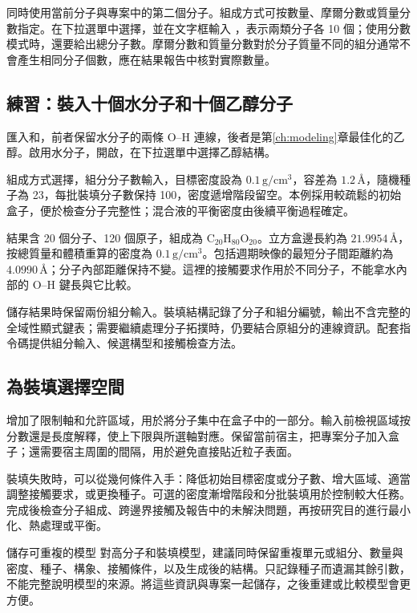 同時使用當前分子與專案中的第二個分子。組成方式可按數量、摩爾分數或質量分數指定。在下拉選單中選擇，並在文字框輸入 ，表示兩類分子各 10 個；使用分數模式時，還要給出總分子數。摩爾分數和質量分數對於分子質量不同的組分通常不會產生相同分子個數，應在結果報告中核對實際數量。

\subsection{練習：裝入十個水分子和十個乙醇分子}

匯入和，前者保留水分子的兩條 O--H 連線，後者是第\ref{ch:modeling}章最佳化的乙醇。啟用水分子，開啟，在下拉選單中選擇乙醇結構。

組成方式選擇，組分分子數輸入，目標密度設為 $0.1\,\mathrm{g/cm^3}$，容差為 $1.2\,\text{\AA}$，隨機種子為 23，每批裝填分子數保持 100，密度遞增階段留空。本例採用較疏鬆的初始盒子，便於檢查分子完整性；混合液的平衡密度由後續平衡過程確定。

結果含 20 個分子、120 個原子，組成為 $\mathrm{C_{20}H_{80}O_{20}}$。立方盒邊長約為 $21.9954\,\text{\AA}$，按總質量和體積重算的密度為 $0.1\,\mathrm{g/cm^3}$。包括週期映像的最短分子間距離約為 $4.0990\,\text{\AA}$；分子內部距離保持不變。這裡的接觸要求作用於不同分子，不能拿水內部的 O--H 鍵長與它比較。

儲存結果時保留兩份組分輸入。裝填結構記錄了分子和組分編號，輸出不含完整的全域性顯式鍵表；需要繼續處理分子拓撲時，仍要結合原組分的連線資訊。配套指令碼提供組分輸入、候選構型和接觸檢查方法。

\subsection{為裝填選擇空間}

增加了限制軸和允許區域，用於將分子集中在盒子中的一部分。輸入前檢視區域按分數還是長度解釋，使上下限與所選軸對應。保留當前宿主，把專案分子加入盒子；還需要宿主周圍的間隔，用於避免直接貼近粒子表面。

裝填失敗時，可以從幾何條件入手：降低初始目標密度或分子數、增大區域、適當調整接觸要求，或更換種子。可選的密度漸增階段和分批裝填用於控制較大任務。完成後檢查分子組成、跨邊界接觸及報告中的未解決問題，再按研究目的進行最小化、熱處理或平衡。

\begin{notebox}{儲存可重複的模型}
對高分子和裝填模型，建議同時保留重複單元或組分、數量與密度、種子、構象、接觸條件，以及生成後的結構。只記錄種子而遺漏其餘引數，不能完整說明模型的來源。將這些資訊與專案一起儲存，之後重建或比較模型會更方便。
\end{notebox}
